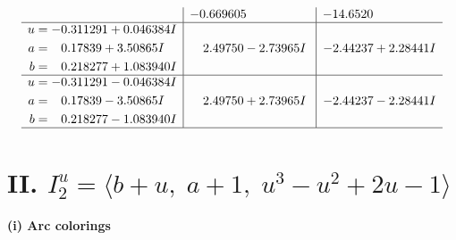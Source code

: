 \documentclass[1p]{elsarticle_modified}
\theoremstyle{definition}
\begin{document}
$$\begin{array}{c|c|c}
 & -0.669605\phantom{ +0.000000I} & -14.6520\phantom{ +0.000000I} \\ \hline\begin{aligned}
u &= -0.311291 + 0.046384 I \\
a &= \phantom{-}0.17839 + 3.50865 I \\
b &= \phantom{-}0.218277 + 1.083940 I\end{aligned}
 & \phantom{-}2.49750 - 2.73965 I & -2.44237 + 2.28441 I \\ \hline\begin{aligned}
u &= -0.311291 - 0.046384 I \\
a &= \phantom{-}0.17839 - 3.50865 I \\
b &= \phantom{-}0.218277 - 1.083940 I\end{aligned}
 & \phantom{-}2.49750 + 2.73965 I & -2.44237 - 2.28441 I\\
 \hline 
 \end{array}$$\newpage\newpage\renewcommand{\arraystretch}{1}
\centering \section*{II. $I^u_{2}= \langle b+u,\;a+1,\;u^3- u^2+2 u-1 \rangle$}
\flushleft \textbf{(i) Arc colorings}\\
\end{document}
